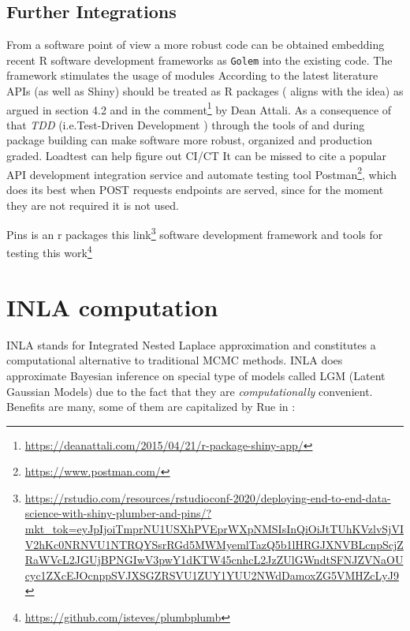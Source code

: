 \documentclass[
  12pt,
  a4paper,
  oneside]{book}
\newcommand{\passthrough}[1]{#1}
\DeclareRobustCommand{\href}[2]{#2\footnote{\url{#1}}}
\theoremstyle{definition}
\theoremstyle{definition}
\theoremstyle{definition}
\theoremstyle{remark}
\begin{document}
\hypertarget{further-integrations}{%
\section{Further Integrations}\label{further-integrations}}

From a software point of view a more robust code can be obtained embedding recent R software development frameworks as \passthrough{\lstinline!Golem!} \citet{colin_fay_2020} into the existing code. The framework stimulates the usage of modules According to the latest literature APIs (as well as Shiny) should be treated as R packages (\citet{plungr} aligns with the idea) as argued in section 4.2 \citet{colin_fay_2020} and in the \href{https://deanattali.com/2015/04/21/r-package-shiny-app/}{comment} by Dean Attali. As a consequence of that \emph{TDD} (i.e.Test-Driven Development \citet{TDD_2004}) through the tools of \citet{usethis} and \citet{testthat} during package building can make software more robust, organized and production graded. Loadtest \citet{loadtest} can help figure out
CI/CT
It can be missed to cite a popular API development integration service and automate testing tool \href{https://www.postman.com/}{Postman}, which does its best when POST requests endpoints are served, since for the moment they are not required it is not used.

Pins is an r packages \href{https://rstudio.com/resources/rstudioconf-2020/deploying-end-to-end-data-science-with-shiny-plumber-and-pins/?mkt_tok=eyJpIjoiTmprNU1USXhPVEprWXpNMSIsInQiOiJtTUhKVzlvSjVIV2hKc0NRNVU1NTRQYSsrRGd5MWMyemlTazQ5b1lHRGJXNVBLcnpScjZRaWVcL2JGUjBPNGIwV3pwY1dKTW45cnhcL2JzZUlGWndtSFNJZVNaOUcyc1ZXcEJOcnppSVJXSGZRSVU1ZUY1YUU2NWdDamoxZG5VMHZcLyJ9}{this link}
software development framework and tools for testing \href{https://github.com/isteves/plumbplumb}{this work}

\hypertarget{inla}{%
\chapter{INLA computation}\label{inla}}

INLA \citep{Rue2009} stands for Integrated Nested Laplace approximation and constitutes a computational alternative to traditional MCMC methods. INLA does approximate Bayesian inference on special type of models called LGM (Latent Gaussian Models) due to the fact that they are \emph{computationally} convenient. Benefits are many, some of them are capitalized by Rue in \citep{YT:Rue}:
\end{document}
